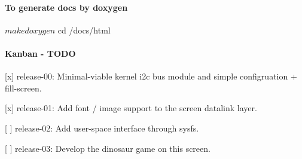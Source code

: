 \paragraph*{To generate docs by doxygen}

\begin{DoxyVerb}    $ make doxygen

    $ cd /docs/html
\end{DoxyVerb}


\paragraph*{Kanban -\/ T\+O\+DO}


\begin{DoxyItemize}
\item \mbox{[}x\mbox{]} release-\/00\+: Minimal-\/viable kernel i2c bus module and simple configruation + fill-\/screen.
\item \mbox{[}x\mbox{]} release-\/01\+: Add font / image support to the screen datalink layer.
\item \mbox{[} \mbox{]} release-\/02\+: Add user-\/space interface through sysfs.
\item \mbox{[} \mbox{]} release-\/03\+: Develop the dinosaur game on this screen. 
\end{DoxyItemize}